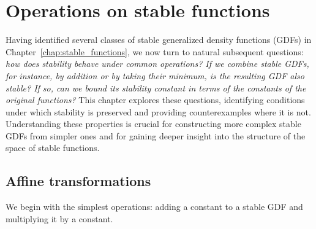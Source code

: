 \chapter{Operations on stable functions}
\label{chap:operations}

Having identified several classes of stable generalized density functions (GDFs)
in Chapter~\ref{chap:stable_functions}, we now turn to natural subsequent
questions: \emph{how does stability behave under common operations?
If we combine stable GDFs, for instance, by addition or by taking their minimum,
is the resulting GDF also stable? If so, can we bound its stability constant in
terms of the constants of the original functions?}
This chapter explores these questions, identifying conditions under which
stability is preserved and providing counterexamples where it is not.
Understanding these properties is crucial for constructing more complex stable
GDFs from simpler ones and for gaining deeper insight into the structure of the
space of stable functions.

\section{Affine transformations}

We begin with the simplest operations: adding a constant to a stable GDF and
multiplying it by a constant.


